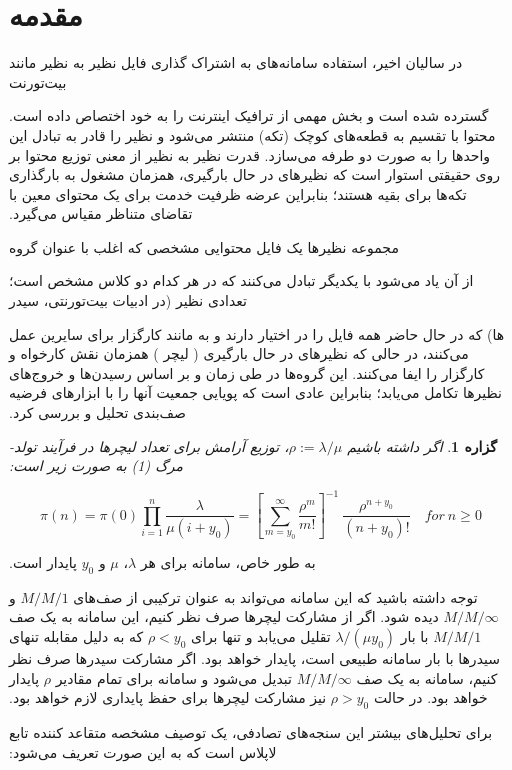 \documentclass[11pt, oneside]{article}
\newcommand{\ev}[2]{%
    #1\endnote{\noindent\hbox to 0.2\textwidth{#1}\lr{#2} }%
}
\newtheorem{proposition}{گزاره}
\begin{document}
\section{مقدمه}
‫در سالیان اخیر، استفاده سامانه‌های به اشتراک گذاری فایل نظیر به نظیر مانند
\ev{بیت‌تورنت}{‌Bittorent}
\cite{c1}
‫گسترده شده است و بخش مهمی از ترافیک اینترنت را به خود اختصاص داده است. محتوا با تقسیم به قطعه‌های کوچک (تکه)
‫منتشر می‌شود و نظیر را قادر به تبادل این واحدها را به صورت دو طرفه می‌سازد. قدرت نظیر به نظیر از معنی توزیع محتوا بر روی حقیقتی استوار است که نظیرهای در حال بارگیری، همزمان مشغول به بارگذاری تکه‌ها برای بقیه هستند؛ بنابراین عرضه ظرفیت خدمت برای یک محتوای معین با تقاضای متناظر مقیاس می‌گیرد.


‫مجموعه نظیرها یک فایل محتوایی مشخصی که اغلب با عنوان
\ev{گروه}{Swarm}
‫از آن یاد می‌شود با یکدیگر تبادل می‌کنند که در هر کدام دو کلاس مشخص است؛ تعدادی نظیر (در ادبیات بیت‌تورنتی،
\ev{سیدر}{Seeder}
‫ها) که در حال حاضر همه فایل را در اختیار دارند و به مانند کارگزار برای سایرین عمل می‌کنند، در حالی که نظیرهای در حال بارگیری
(\ev{لیچر}{Leecher})
‫همزمان نقش کارخواه و کارگزار را ایفا می‌کنند. این گروه‌ها در طی زمان و بر اساس رسیدن‌ها و خروج‌های نظیرها تکامل می‌یابد؛ بنابراین عادی است که پویایی جمعیت‌ آنها را با ابزارهای فرضیه صف‌بندی تحلیل و بررسی کرد.
‫
\begin{proposition}
‫اگر داشته باشیم $\rho:=\lambda/\mu$، توزیع آرامش برای تعداد لیچرها در فرآیند تولد-مرگ (1) به صورت زیر است:

\begin{equation}
\pi(n)=\pi(0)\prod_{i=1}^{n}\frac{\lambda}{\mu (i+y_0)}=\left[\sum_{m=y_0}^{\infty}\frac{\rho^m}{m!}\right]^{-1}\ \frac{\rho^{n+y_0}}{(n+y_0)!}\quad for\ n \geq 0
\end{equation}
\end{proposition}

‫به طور خاص، سامانه برای هر $\lambda$، $\mu$ و $y_0$ پایدار است.

‫توجه داشته باشید که این سامانه می‌تواند به عنوان ترکیبی از صف‌های $M/M/1$ و $M/M/\infty$ دیده شود. اگر از مشارکت لیچرها صرف نظر کنیم، این سامانه به یک صف $M/M/1$ با بار $\lambda/(\mu y_0)$ تقلیل می‌یابد و تنها برای $\rho<y_0$ که به دلیل مقابله تنهای سیدرها با بار سامانه طبیعی است، پایدار خواهد بود. اگر مشارکت سیدرها صرف نظر کنیم، سامانه به یک صف $M/M/\infty$ تبدیل می‌شود و سامانه برای تمام مقادیر $\rho$ پایدار خواهد بود. در حالت $\rho>y_0$ نیز مشارکت لیچرها برای حفظ پایداری لازم خواهد بود.


‫برای تحلیل‌های بیشتر این سنجه‌های تصادفی، یک توصیف مشخصه متقاعد کننده تابع لاپلاس است که به این صورت تعریف می‌شود:
\end{document}
